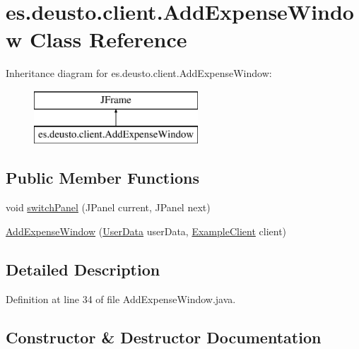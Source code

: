 \hypertarget{classes_1_1deusto_1_1client_1_1_add_expense_window}{}\section{es.\+deusto.\+client.\+Add\+Expense\+Window Class Reference}
\label{classes_1_1deusto_1_1client_1_1_add_expense_window}
Inheritance diagram for es.\+deusto.\+client.\+Add\+Expense\+Window\+:\begin{figure}[H]
\begin{center}
\leavevmode
\includegraphics[height=2.000000cm]{classes_1_1deusto_1_1client_1_1_add_expense_window}
\end{center}
\end{figure}
\subsection*{Public Member Functions}
\begin{DoxyCompactItemize}
\item 
void \hyperlink{classes_1_1deusto_1_1client_1_1_add_expense_window_a6240f4fbc81e74662e2b811e20768e9a}{switch\+Panel} (J\+Panel current, J\+Panel next)
\item 
\hyperlink{classes_1_1deusto_1_1client_1_1_add_expense_window_a02db23fc03228f06fef302c1df129b27}{Add\+Expense\+Window} (\hyperlink{classes_1_1deusto_1_1serialization_1_1_user_data}{User\+Data} user\+Data, \hyperlink{classes_1_1deusto_1_1client_1_1_example_client}{Example\+Client} client)
\end{DoxyCompactItemize}


\subsection{Detailed Description}


Definition at line 34 of file Add\+Expense\+Window.\+java.



\subsection{Constructor \& Destructor Documentation}
\mbox{\label{classes_1_1deusto_1_1client_1_1_add_expense_window_a02db23fc03228f06fef302c1df129b27}} 
